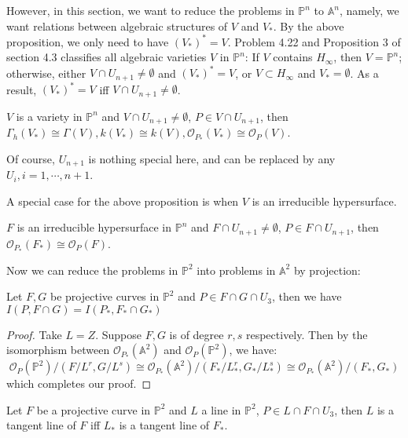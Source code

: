 \documentclass{solution}
\begin{document}
However, in this section, we want to reduce the problems in $\mathbb{P}^n$ to $\mathbb{A}^n$, namely, we want relations between algebraic structures of $V$ and $V_*$. By the above proposition, we only need to have $(V_*)^* = V$. Problem 4.22 and Proposition 3 of section 4.3 classifies all algebraic varieties $V$ in $\mathbb{P}^n$: If $V$ contains $H_{\infty}$, then $V = \mathbb{P}^n$; otherwise, either $V \cap U_{n + 1} \ne \emptyset$ and $(V_*)^* = V$, or $V \subset H_{\infty}$ and $V_* = \emptyset$. As a result, $(V_*)^* = V$ iff $V \cap U_{n + 1} \ne \emptyset$.

\begin{proposition}
    $V$ is a variety in $\mathbb{P}^n$ and $V \cap U_{n + 1} \ne \emptyset$, $P \in V \cap U_{n + 1}$, then $\Gamma_h(V_*) \cong \Gamma(V), k(V_*) \cong k(V), \mathcal{O}_{P_*}(V_*) \cong \mathcal{O}_{P}(V)$.
\end{proposition}

Of course, $U_{n + 1}$ is nothing special here, and can be replaced by any $U_{i}, i = 1, \cdots, n + 1$.

A special case for the above proposition is when $V$ is an irreducible hypersurface.

\begin{proposition}
    $F$ is an irreducible hypersurface in $\mathbb{P}^n$ and $F \cap U_{n + 1} \ne \emptyset$, $P \in F \cap U_{n + 1}$, then $\mathcal{O}_{P_*}(F_*) \cong \mathcal{O}_{P}(F)$.
\end{proposition}

Now we can reduce the problems in $\mathbb{P}^2$ into problems in $\mathbb{A}^2$ by projection:

\begin{proposition}\label{props:lem-intersection-number}
    Let $F, G$ be projective curves in $\mathbb{P}^2$ and $P \in F \cap G \cap U_3$, then we have $I(P, F \cap G) = I(P_*, F_* \cap G_*)$
\end{proposition}

\begin{proof}
    Take $L = Z$. Suppose $F, G$ is of degree $r, s$ respectively. Then by the isomorphism between $\mathcal{O}_{P_*}(\mathbb{A}^2)$ and $\mathcal{O}_{P}(\mathbb{P}^2)$, we have:
    $$\mathcal{O}_{P}(\mathbb{P}^2) / (F / L^r, G / L^s) \cong \mathcal{O}_{P_*}(\mathbb{A}^2) / (F_* / L_*^r, G_* / L_*^s) \cong \mathcal{O}_{P_*}(\mathbb{A}^2) / (F_*, G_*)$$
    which completes our proof.
\end{proof}

\begin{corollary}\label{cor:tangent-line-homo}
    Let $F$ be a projective curve in $\mathbb{P}^2$ and $L$ a line in $\mathbb{P}^2$, $P \in L \cap F \cap U_3$, then $L$ is a tangent line of $F$ iff $L_*$ is a tangent line of $F_*$.
\end{corollary}
\end{document}
